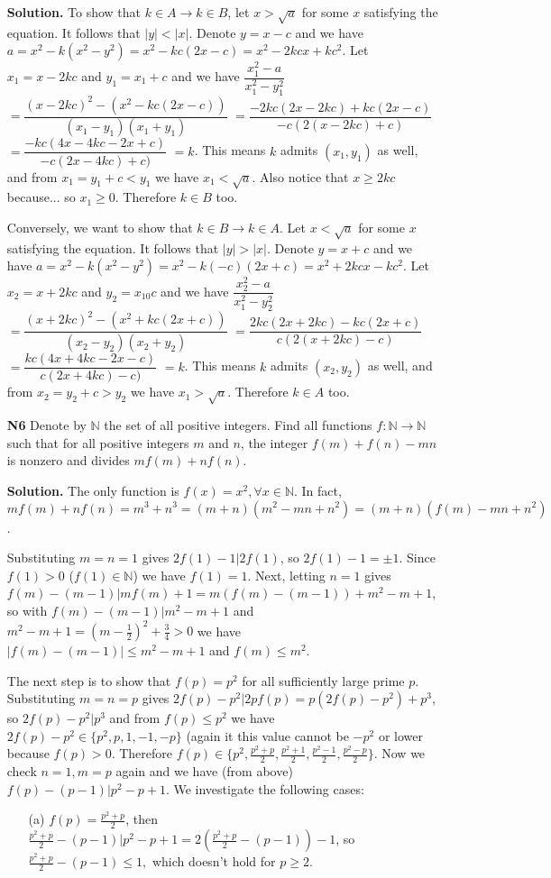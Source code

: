 \documentclass[11pt,a4paper]{article}
\begin{document}
\begin{itemize}
\textbf{Solution.} 
To show that $k\in A\to k\in B$, let $x>\sqrt{a}$ for some $x$ satisfying the equation. 
It follows that $|y|<|x|$. 
Denote $y=x-c$ and we have $a=x^2-k(x^2-y^2)=x^2-kc(2x-c)=x^2-2kcx+kc^2$. 
Let $x_1=x-2kc$ and $y_1=x_1+c$ and we have 
$\dfrac{x_1^2-a}{x_1^2-y_1^2}$
$=\dfrac{(x-2kc)^2-(x^2-kc(2x-c))}{(x_1-y_1)(x_1+y_1)}$
$=\dfrac{-2kc(2x-2kc)+kc(2x-c)}{-c(2(x-2kc)+c)}$
$=\dfrac{-kc(4x-4kc-2x+c)}{-c(2x-4kc)+c)}$
$=k$. 
This means $k$ admits $(x_1, y_1)$ as well, and from $x_1=y_1+c<y_1$ we have $x_1<\sqrt{a}$. 
Also notice that $x\ge 2kc$ because... so $x_1\ge 0$. Therefore
$k\in B$ too. 

Conversely, we want to show that $k\in B\to k\in A$. 
Let $x<\sqrt{a}$ for some $x$ satisfying the equation. 
It follows that $|y|>|x|$. 
Denote $y=x+c$ and we have $a=x^2-k(x^2-y^2)=x^2-k(-c)(2x+c)=x^2+2kcx-kc^2$. 
Let $x_2=x+2kc$ and $y_2=x_10c$ and we have 
$\dfrac{x_2^2-a}{x_1^2-y_2^2}$
$=\dfrac{(x+2kc)^2-(x^2+kc(2x+c))}{(x_2-y_2)(x_2+y_2)}$
$=\dfrac{2kc(2x+2kc)-kc(2x+c)}{c(2(x+2kc)-c)}$
$=\dfrac{kc(4x+4kc-2x-c)}{c(2x+4kc)-c)}$
$=k$. 
This means $k$ admits $(x_2, y_2)$ as well, and from $x_2=y_2+c>y_2$ we have $x_1>\sqrt{a}$. Therefore
$k\in A$ too. 

\newpage

\item[\textbf{N6}]
Denote by $\mathbb{N}$ the set of all positive integers. Find all functions $f:\mathbb{N}\rightarrow \mathbb{N}$ such that for all positive integers $m$ and $n$, the integer $f(m)+f(n)-mn$ is nonzero and divides $mf(m)+nf(n)$.

\textbf{Solution.}
The only function is $f(x)=x^2, \forall x\in\mathbb{N}$. 
In fact, $mf(m)+nf(n)=m^3+n^3=(m+n)(m^2-mn+n^2)=(m+n)(f(m)-mn+n^2)$. 

Substituting $m=n=1$ gives $2f(1)-1|2f(1)$, so $2f(1)-1=\pm 1$. 
Since $f(1) > 0$ ($f(1)\in\mathbb{N}$) we have $f(1)=1$. 
Next, letting $n=1$ gives $f(m)-(m-1)|mf(m)+1=m(f(m)-(m-1))+m^2-m+1$, 
so with $f(m)-(m-1)|m^2-m+1$ and $m^2-m+1=(m-\frac 12)^2+\frac 34 > 0$ we have 
$|f(m)-(m-1)|\le m^2-m+1$ and $f(m)\le m^2$. 

The next step is to show that $f(p)=p^2$ for all sufficiently large prime $p$. 
Substituting $m=n=p$ gives $2f(p)-p^2|2pf(p)=p(2f(p)-p^2)+p^3$, so 
$2f(p)-p^2|p^3$ and from $f(p)\le p^2$ we have 
$2f(p)-p^2\in\{p^2, p, 1, -1, -p\}$ (again it this value cannot be $-p^2$ or lower because $f(p)>0$. 
Therefore $f(p)\in\{p^2, \frac{p^2+p}2, \frac{p^2+1}2, \frac{p^2-1}2, \frac{p^2-p}2\}$. 
Now we check $n=1, m=p$ again and we have (from above) $f(p)-(p-1)|p^2-p+1$. 
We investigate the following cases: 
\begin{itemize}
\item [(a)] $f(p)=\frac{p^2+p}2$, 
then $\frac{p^2+p}2-(p-1)|p^2-p+1=2(\frac{p^2+p}2-(p-1))-1$, 
so $\frac{p^2+p}2-(p-1)\le 1, $
which doesn't hold for $p\ge 2$. 


\end{itemize}
\end{itemize}
\end{document}
